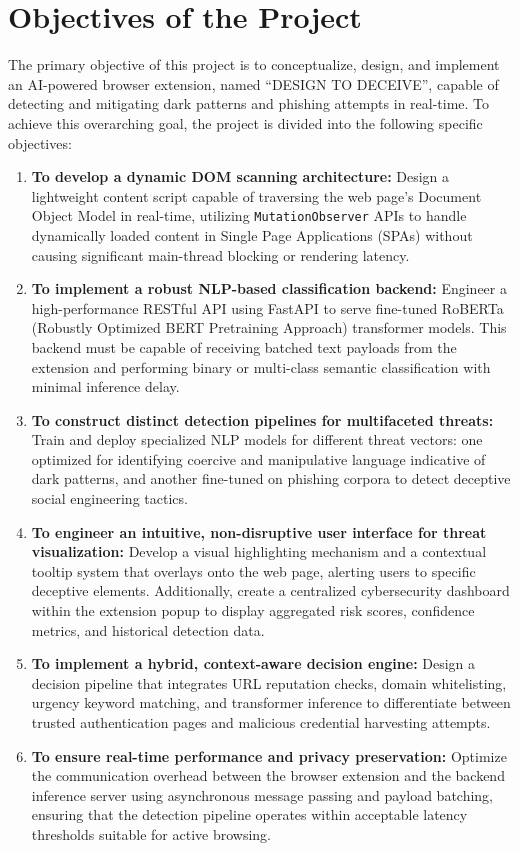 \documentclass[12pt,a4paper]{report}
\begin{document}
\section{Objectives of the Project}
The primary objective of this project is to conceptualize, design, and implement an AI-powered browser extension, named ``DESIGN TO DECEIVE'', capable of detecting and mitigating dark patterns and phishing attempts in real-time. To achieve this overarching goal, the project is divided into the following specific objectives:

\begin{enumerate}
    \item \textbf{To develop a dynamic DOM scanning architecture:} Design a lightweight content script capable of traversing the web page's Document Object Model in real-time, utilizing \texttt{MutationObserver} APIs to handle dynamically loaded content in Single Page Applications (SPAs) without causing significant main-thread blocking or rendering latency.
    \item \textbf{To implement a robust NLP-based classification backend:} Engineer a high-performance RESTful API using FastAPI to serve fine-tuned RoBERTa (Robustly Optimized BERT Pretraining Approach) transformer models. This backend must be capable of receiving batched text payloads from the extension and performing binary or multi-class semantic classification with minimal inference delay.
    \item \textbf{To construct distinct detection pipelines for multifaceted threats:} Train and deploy specialized NLP models for different threat vectors: one optimized for identifying coercive and manipulative language indicative of dark patterns, and another fine-tuned on phishing corpora to detect deceptive social engineering tactics.
    \item \textbf{To engineer an intuitive, non-disruptive user interface for threat visualization:} Develop a visual highlighting mechanism and a contextual tooltip system that overlays onto the web page, alerting users to specific deceptive elements. Additionally, create a centralized cybersecurity dashboard within the extension popup to display aggregated risk scores, confidence metrics, and historical detection data.
    \item \textbf{To implement a hybrid, context-aware decision engine:} Design a decision pipeline that integrates URL reputation checks, domain whitelisting, urgency keyword matching, and transformer inference to differentiate between trusted authentication pages and malicious credential harvesting attempts.
    \item \textbf{To ensure real-time performance and privacy preservation:} Optimize the communication overhead between the browser extension and the backend inference server using asynchronous message passing and payload batching, ensuring that the detection pipeline operates within acceptable latency thresholds suitable for active browsing.
\end{enumerate}
\end{document}
